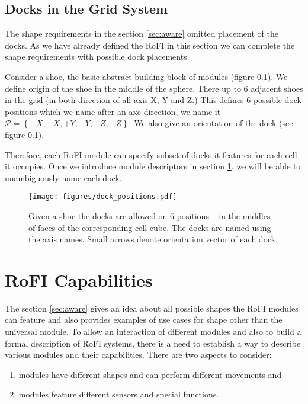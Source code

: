 \subsection{Docks in the Grid System}\label{sec:dock_in_grid}

The shape requirements in the section \ref{sec:aware} omitted placement of the
docks. As we have already defined the RoFI in this section we can complete the
shape requirements with possible dock placements.

Consider a shoe, the basic abstract building block of modules (figure
\ref{sec:dock_in_grid}). We define origin of the shoe in the middle of the
sphere. There up to 6 adjacent shoes in the grid (in both direction of all axis
X, Y and Z.) This defines 6 possible dock positions which we name after an axe
direction, we name it $\mathcal{P} = \left\{+X, -X, +Y, -Y, +Z, -Z\right\}$. We
also give an orientation of the dock (see figure \ref{sec:dock_in_grid}).

Therefore, each RoFI module can specify subset of docks it features for each
cell it occupies. Once we introduce module descriptors in section
\ref{sec:capabilities}, we will be able to unambiguously name each dock.

\begin{figure}[h!]
    \centering
    \texttt{[image: figures/dock\_positions.pdf]}
    \caption{Given a shoe the docks are allowed on 6 positions -- in the
    middles of faces of the corresponding cell cube. The docks are named using
    the axis names. Small arrows denote orientation vector of each dock.}
    \label{fig:dock_positions}
\end{figure}


\section{RoFI Capabilities}\label{sec:capabilities}

The section \ref{sec:aware} gives an idea about all possible shapes the RoFI
modules can feature and also provides examples of use cases for shape other than
the universal module. To allow an interaction of different modules and also to
build a formal description of RoFI systems, there is a need to establish a way
to describe various modules and their capabilities. There are two aspects to
consider:
\begin{enumerate}
    \item modules have different shapes and can perform different movements and
    \item modules feature different sensors and special functions.
\end{enumerate}

